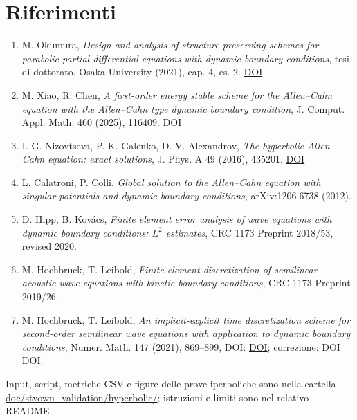\documentclass[11pt,a4paper]{article}
\begin{document}
\section*{Riferimenti}
{\small\begin{enumerate}\setlength{\itemsep}{0pt}
\item M. Okumura, \emph{Design and analysis of structure-preserving schemes for parabolic partial differential equations with dynamic boundary conditions}, tesi di dottorato, Osaka University (2021), cap. 4, es. 2. \href{https://doi.org/10.18910/82279}{DOI}
\item M. Xiao, R. Chen, \emph{A first-order energy stable scheme for the Allen--Cahn equation with the Allen--Cahn type dynamic boundary condition}, J. Comput. Appl. Math. 460 (2025), 116409. \href{https://doi.org/10.1016/j.cam.2024.116409}{DOI}
\item I. G. Nizovtseva, P. K. Galenko, D. V. Alexandrov, \emph{The hyperbolic Allen--Cahn equation: exact solutions}, J. Phys. A 49 (2016), 435201. \href{https://doi.org/10.1088/1751-8113/49/43/435201}{DOI}
\item L. Calatroni, P. Colli, \emph{Global solution to the Allen--Cahn equation with singular potentials and dynamic boundary conditions}, arXiv:1206.6738 (2012).
\item D. Hipp, B. Kovács, \emph{Finite element error analysis of wave equations with dynamic boundary conditions: $L^2$ estimates}, CRC 1173 Preprint 2018/53, revised 2020.
\item M. Hochbruck, T. Leibold, \emph{Finite element discretization of semilinear acoustic wave equations with kinetic boundary conditions}, CRC 1173 Preprint 2019/26.
\item M. Hochbruck, T. Leibold, \emph{An implicit-explicit time discretization scheme for second-order semilinear wave equations with application to dynamic boundary conditions}, Numer. Math. 147 (2021), 869--899, DOI: \href{https://doi.org/10.1007/s00211-021-01184-w}{DOI}; correzione: DOI \href{https://doi.org/10.1007/s00211-021-01190-y}{DOI}.
\end{enumerate}}
\vfill\noindent\small Input, script, metriche CSV e figure delle prove iperboliche sono nella cartella \url{doc/stvowu_validation/hyperbolic/}; istruzioni e limiti sono nel relativo README.
\end{document}
